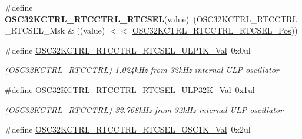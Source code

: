 \begin{DoxyCompactItemize}
\item 
\hypertarget{group___s_a_m_l21___o_s_c32_k_c_t_r_l_ga9c5410c5a3c5f72873b82a08fddfa6d1}{}\#define {\bfseries O\+S\+C32\+K\+C\+T\+R\+L\+\_\+\+R\+T\+C\+C\+T\+R\+L\+\_\+\+R\+T\+C\+S\+E\+L}(value)~(O\+S\+C32\+K\+C\+T\+R\+L\+\_\+\+R\+T\+C\+C\+T\+R\+L\+\_\+\+R\+T\+C\+S\+E\+L\+\_\+\+Msk \& ((value) $<$$<$ \hyperlink{group___s_a_m_l21___o_s_c32_k_c_t_r_l_gadcfbd528df699f49aa94aed33cfa1324}{O\+S\+C32\+K\+C\+T\+R\+L\+\_\+\+R\+T\+C\+C\+T\+R\+L\+\_\+\+R\+T\+C\+S\+E\+L\+\_\+\+Pos}))\label{group___s_a_m_l21___o_s_c32_k_c_t_r_l_ga9c5410c5a3c5f72873b82a08fddfa6d1}

\item 
\hypertarget{group___s_a_m_l21___o_s_c32_k_c_t_r_l_gabc6a6db1dfeac26e74f33b4afd4a1252}{}\#define \hyperlink{group___s_a_m_l21___o_s_c32_k_c_t_r_l_gabc6a6db1dfeac26e74f33b4afd4a1252}{O\+S\+C32\+K\+C\+T\+R\+L\+\_\+\+R\+T\+C\+C\+T\+R\+L\+\_\+\+R\+T\+C\+S\+E\+L\+\_\+\+U\+L\+P1\+K\+\_\+\+Val}~0x0ul\label{group___s_a_m_l21___o_s_c32_k_c_t_r_l_gabc6a6db1dfeac26e74f33b4afd4a1252}

\begin{DoxyCompactList}\small\item\em (O\+S\+C32\+K\+C\+T\+R\+L\+\_\+\+R\+T\+C\+C\+T\+R\+L) 1.\+024k\+Hz from 32k\+Hz internal U\+L\+P oscillator \end{DoxyCompactList}\item 
\hypertarget{group___s_a_m_l21___o_s_c32_k_c_t_r_l_gae97e1489ab8d1f1a49d8e7e2ad8b7427}{}\#define \hyperlink{group___s_a_m_l21___o_s_c32_k_c_t_r_l_gae97e1489ab8d1f1a49d8e7e2ad8b7427}{O\+S\+C32\+K\+C\+T\+R\+L\+\_\+\+R\+T\+C\+C\+T\+R\+L\+\_\+\+R\+T\+C\+S\+E\+L\+\_\+\+U\+L\+P32\+K\+\_\+\+Val}~0x1ul\label{group___s_a_m_l21___o_s_c32_k_c_t_r_l_gae97e1489ab8d1f1a49d8e7e2ad8b7427}

\begin{DoxyCompactList}\small\item\em (O\+S\+C32\+K\+C\+T\+R\+L\+\_\+\+R\+T\+C\+C\+T\+R\+L) 32.\+768k\+Hz from 32k\+Hz internal U\+L\+P oscillator \end{DoxyCompactList}\item 
\hypertarget{group___s_a_m_l21___o_s_c32_k_c_t_r_l_gab8e2a5382213b202bb22efed0e4a0da9}{}\#define \hyperlink{group___s_a_m_l21___o_s_c32_k_c_t_r_l_gab8e2a5382213b202bb22efed0e4a0da9}{O\+S\+C32\+K\+C\+T\+R\+L\+\_\+\+R\+T\+C\+C\+T\+R\+L\+\_\+\+R\+T\+C\+S\+E\+L\+\_\+\+O\+S\+C1\+K\+\_\+\+Val}~0x2ul\label{group___s_a_m_l21___o_s_c32_k_c_t_r_l_gab8e2a5382213b202bb22efed0e4a0da9}


\end{DoxyCompactItemize}
